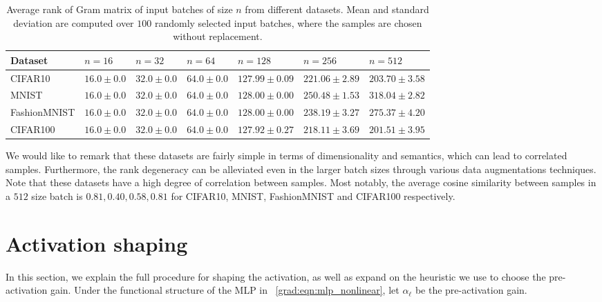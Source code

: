 \begin{table}[htp!]
\centering
\caption{Average rank of Gram matrix of input batches of size $n$ from different datasets. Mean and standard deviation are computed over $100$ randomly selected input batches, where the samples are chosen without replacement.}
\label{grad:tab:batch_degen}
\scriptsize
\begin{tabular}[c]{|l|l|l|l|l|l|l|}
\hline
Dataset      & $n=16$          & $n=32$          & $n=64$           & $n=128$             & $n=256$             & $n=512$ \\ \hline
CIFAR10      & $16.0 \pm 0.0$  & $32.0 \pm 0.0$  & $64.0 \pm 0.0$   & $127.99 \pm 0.09$   & $221.06 \pm 2.89$   & $203.70 	\pm 3.58$    \\ \hline
MNIST        & $16.0 \pm 0.0$  & $32.0 \pm 0.0$  & $64.0 \pm 0.0$   & $128.00 \pm 0.00$   & $250.48 \pm 1.53$   & $318.04   \pm 2.82$    \\ \hline
FashionMNIST & $16.0 \pm 0.0$  & $32.0 \pm 0.0$  & $64.0 \pm 0.0$   & $128.00 \pm 0.00$   & $238.19 \pm 3.27$   & $275.37   \pm 4.20$    \\ \hline
CIFAR100     & $16.0 \pm 0.0$  & $32.0 \pm 0.0$  & $64.0 \pm 0.0$   & $127.92 \pm 0.27$   & $218.11 \pm 3.69$   & $201.51 	\pm 3.95$   \\ \hline
\end{tabular}
\end{table}

We would like to remark that these datasets are fairly simple in terms of dimensionality and semantics, which can lead to correlated samples. Furthermore, the rank degeneracy can be alleviated even in the larger batch sizes through various data augmentations techniques. Note that these datasets have a high degree of correlation between samples. Most notably, the average cosine similarity between samples in a $512$ size batch is $0.81, 0.40, 0.58, 0.81$ for CIFAR10, MNIST, FashionMNIST and CIFAR100 respectively.
% 


\section{Activation shaping}
\label{grad:sec:shaping}
In this section, we explain the full procedure for shaping the activation, as well as expand on the heuristic we use to choose the pre-activation gain. Under the functional structure of the MLP in ~\eqref{grad:eqn:mlp_nonlinear}, let $\alpha_\ell$ be the pre-activation gain. 

